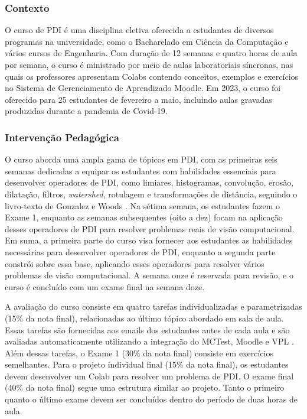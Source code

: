 \subsubsection{Contexto} \label{sec:cont}

O curso de PDI é uma disciplina eletiva oferecida a estudantes de diversos programas na universidade, como o Bacharelado em Ciência da Computação e vários cursos de Engenharia. Com duração de 12 semanas e quatro horas de aula por semana, o curso é ministrado por meio de aulas laboratoriais síncronas, nas quais os professores apresentam Colabs contendo conceitos, exemplos e exercícios no Sistema de Gerenciamento de Aprendizado Moodle. Em 2023, o curso foi oferecido para 25 estudantes de fevereiro a maio, incluindo aulas gravadas produzidas durante a pandemia de Covid-19.

\subsubsection{Intervenção Pedagógica} \label{sec:pi}

O curso aborda uma ampla gama de tópicos em PDI, com as primeiras seis semanas dedicadas a equipar os estudantes com habilidades essenciais para desenvolver operadores de PDI, como limiares, histogramas, convolução, erosão, dilatação, filtros, \textit{watershed}, rotulagem e transformações de distância, seguindo o livro-texto de Gonzalez e Woods \cite{gonzalez2009processamento}. Na sétima semana, os estudantes fazem o Exame 1, enquanto as semanas subsequentes (oito a dez) focam na aplicação desses operadores de PDI para resolver problemas reais de visão computacional. Em suma, a primeira parte do curso visa fornecer aos estudantes as habilidades necessárias para desenvolver operadores de PDI, enquanto a segunda parte constrói sobre essa base, aplicando esses operadores para resolver vários problemas de visão computacional. A semana onze é reservada para revisão, e o curso é concluído com um exame final na semana doze.

A avaliação do curso consiste em quatro tarefas individualizadas e parametrizadas (15\% da nota final), relacionadas ao último tópico abordado em sala de aula. Essas tarefas são fornecidas aos emails dos estudantes antes de cada aula e são avaliadas automaticamente utilizando a integração do MCTest, Moodle e VPL \cite{2020:Zampirolli.Pisani.ea,2021:Zampirolli.Sato.ea}. Além dessas tarefas, o Exame 1 (30\% da nota final) consiste em exercícios semelhantes. Para o projeto individual final (15\% da nota final), os estudantes devem desenvolver um Colab para resolver um problema de PDI. O exame final (40\% da nota final) segue uma estrutura similar ao projeto. Tanto o primeiro quanto o último exame devem ser concluídos dentro do período de duas horas de aula.

